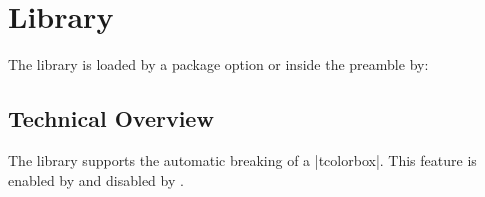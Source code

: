 \clearpage
\section{Library }\label{sec:breakable}
The library is loaded by a package option or inside the preamble by:
\begin{dispListing}
\end{dispListing}

\subsection{Technical Overview}
The library  supports the automatic breaking of a |tcolorbox|.
This feature is enabled by 
and disabled by .

